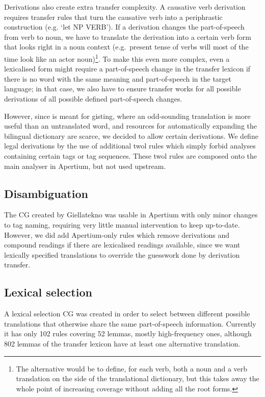 Derivations also create extra transfer complexity. A causative verb
derivation requires transfer rules that turn the causative verb into a
periphrastic construction (e.g. `let NP VERB'). If a derivation
changes the part-of-speech from verb to noun, we have to translate the
derivation into a certain verb form that looks right in a noun context
(e.g.~present tense of \nob verbs will most of the time look like an
actor noun)\footnote{The alternative would be to define, for each \sme{}
  verb, both a noun and a verb translation on the \nob side of the
  translational dictionary, but this takes away the whole point of
  increasing coverage without adding all the root forms.}. To make
this even more complex, even a lexicalised form might require a
part-of-speech change in the transfer lexicon if there is no word with
the same meaning and part-of-speech in the target language; in that
case, we also have to ensure transfer works for all possible
derivations of all possible defined part-of-speech changes.

However, since \smenob{} is meant for gisting, where an odd-sounding
translation is more useful than an untranslated word, and resources
for automatically expanding the bilingual dictionary are scarce, we
decided to allow certain derivations. We define legal derivations by
the use of additional twol rules which simply forbid analyses
containing certain tags or tag sequences. These twol rules are
composed onto the main analyser in Apertium, but not used upstream.

\subsection{Disambiguation}
The CG created by Giellatekno was usable in Apertium with only minor
changes to tag naming, requiring very little manual intervention to
keep up-to-date. However, we did add Apertium-only rules which remove
derivations and compound readings if there are lexicalised readings
available, since we want lexically specified translations to override
the guesswork done by derivation transfer.

\subsection{Lexical selection}
A lexical selection CG was created in order to select between
different possible translations that otherwise share the same
part-of-speech information. Currently it has only 102 rules covering
52 lemmas, mostly high-frequency ones, although 802 lemmas of the
transfer lexicon have at least one alternative translation.

